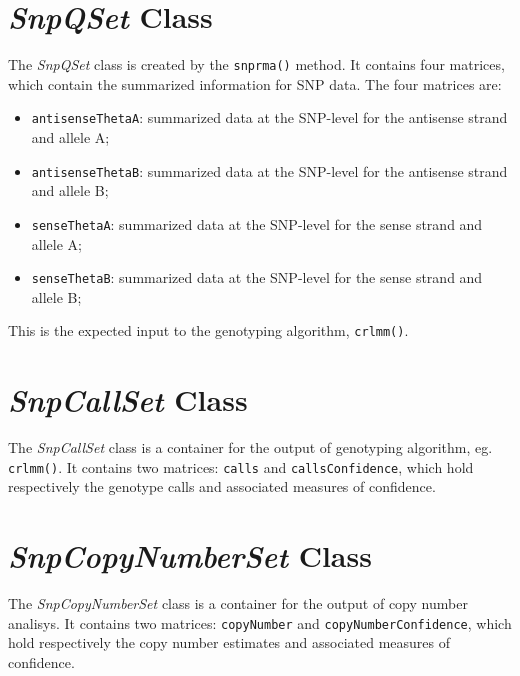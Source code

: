 \documentclass{article}
\newcommand{\Rmethod}[1]{{\texttt{#1}}}
\newcommand{\Robject}[1]{{\texttt{#1}}}
\newcommand{\Rclass}[1]{{\textit{#1}}}
\begin{document}
\section{\Rclass{SnpQSet} Class}
The \Rclass{SnpQSet} class is created by the \Rmethod{snprma()} method. It contains four matrices, which contain the summarized information for SNP data. The four matrices are:
\begin{itemize}
\item \Robject{antisenseThetaA}: summarized data at the SNP-level for the antisense strand and allele A;
\item \Robject{antisenseThetaB}: summarized data at the SNP-level for the antisense strand and allele B;
\item \Robject{senseThetaA}: summarized data at the SNP-level for the sense strand and allele A;
\item \Robject{senseThetaB}: summarized data at the SNP-level for the sense strand and allele B;
\end{itemize}

This is the expected input to the genotyping algorithm, \Rmethod{crlmm()}.

\section{\Rclass{SnpCallSet} Class}

The \Rclass{SnpCallSet} class is a container for the output of genotyping algorithm, eg. \Rmethod{crlmm()}. It contains two matrices: \Robject{calls} and \Robject{callsConfidence}, which hold respectively the genotype calls and associated measures of confidence.

\section{\Rclass{SnpCopyNumberSet} Class}

The \Rclass{SnpCopyNumberSet} class is a container for the output of copy number analisys. It contains two matrices: \Robject{copyNumber} and \Robject{copyNumberConfidence}, which hold respectively the copy number estimates and associated measures of confidence.
\end{document}
